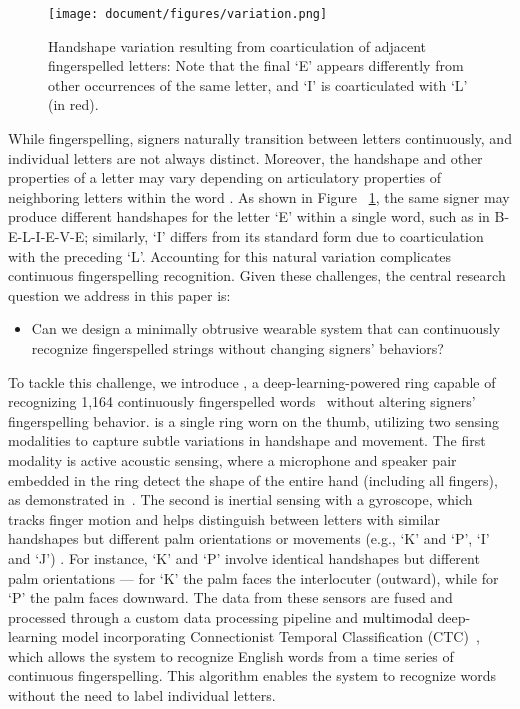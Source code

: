 \begin{figure}[t]
  \texttt{[image: document/figures/variation.png]}
  \caption{Handshape variation resulting from coarticulation of adjacent fingerspelled letters: Note that the final `E' appears differently from other occurrences of the same letter, and `I' is coarticulated with `L' (in red). }
  \label{fig:variation}
\end{figure}
While fingerspelling, signers naturally transition between letters continuously, and individual letters are not always distinct. Moreover, the handshape and other properties of a letter may vary depending on articulatory properties of neighboring letters within the word \cite{keane2015segmentation}. As shown in Figure ~\ref{fig:variation}, the same signer may produce different handshapes for the letter ‘E’ within a single word, such as in B-E-L-I-E-V-E; similarly, ‘I' differs from its standard form due to coarticulation with the preceding ‘L'. Accounting for this natural variation complicates continuous fingerspelling recognition. Given these challenges, the central research question we address in this paper is:
\begin{itemize}
    \item Can we design a minimally obtrusive wearable system that can continuously recognize fingerspelled strings without changing signers' behaviors?
\end{itemize}

To tackle this challenge, we introduce \theDevice{}, a deep-learning-powered ring capable of recognizing 1,164 continuously fingerspelled words~\cite{mackenzie2003phrase} without altering signers' fingerspelling behavior. \theDevice{} is a single ring worn on the thumb, utilizing two sensing modalities to capture subtle variations in handshape and movement. The first modality is active acoustic sensing, where a microphone and speaker pair embedded in the ring detect the shape of the entire hand (including all fingers), as demonstrated in~\cite{yu2024ring}. The second is inertial sensing with a gyroscope, which tracks finger motion and helps distinguish between letters with similar handshapes but different palm orientations or movements (e.g., ‘K’ and ‘P’, ‘I’ and ‘J’) \cite{zhang2017fingorbits,zhang2017fingersound}. For instance, ‘K’ and ‘P’ involve identical handshapes but different palm orientations — for ‘K' the palm faces the interlocuter (outward), while for `P' the palm faces downward. The data from these sensors are fused and processed through a custom data processing pipeline and \textcolor{black}{multimodal} deep-learning model incorporating Connectionist Temporal Classification (CTC)~\cite{graves2012connectionist}, which allows the system to recognize English words from a time series of continuous fingerspelling. This algorithm enables the system to recognize words without the need to label individual letters. 

